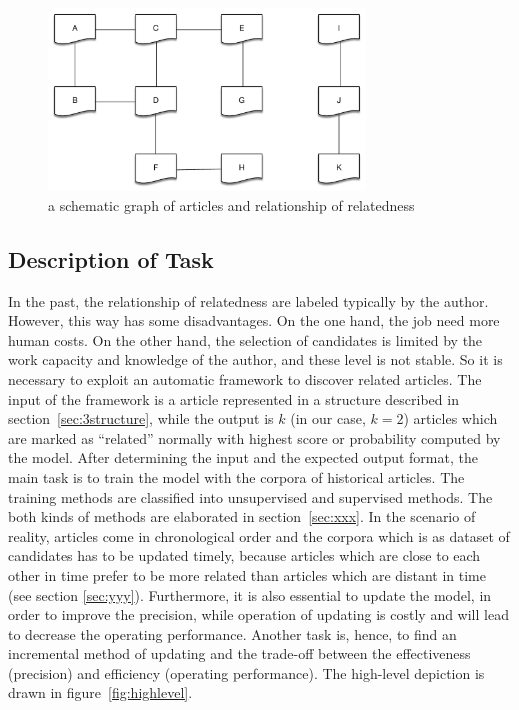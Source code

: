 \begin{figure}[!htb]
    \centering
    \includegraphics[width=0.75\textwidth]{fig/relatedness.pdf}
    \caption{a schematic graph of articles and relationship of relatedness}
    \label{fig:relatedness}
\end{figure}


\subsection{Description of Task}
\label{sec:3.2}

In the past, the relationship of relatedness are labeled typically by the author. However, this way has some disadvantages. On the one hand, the job need more human costs. On the other hand, the selection of candidates is limited by the work capacity and knowledge of the author, and these level is not stable. So it is necessary to exploit an automatic framework to discover related articles. The input of the framework is a article represented in a structure described in section~\ref{sec:3structure}, while the output is $k$ (in our case, $k=2$) articles which are marked as ``related'' normally with highest score or probability computed by the model. After determining the input and the expected output format, the main task is to train the model with the corpora of historical articles. The training methods are classified into unsupervised and supervised methods. The both kinds of methods are elaborated in section~\ref{sec:xxx}. In the scenario of reality, articles come in chronological order and the corpora which is as dataset of candidates has to be updated timely, because articles which are close to each other in time prefer to be more related than articles which are distant in time (see section \ref{sec:yyy}). Furthermore, it is also essential to update the model, in order to improve the precision, while operation of updating is costly and will lead to decrease the operating performance. Another task is, hence, to find an incremental method of updating and the trade-off between the effectiveness (precision) and efficiency (operating performance). The high-level depiction is drawn in figure~\ref{fig:highlevel}. 

